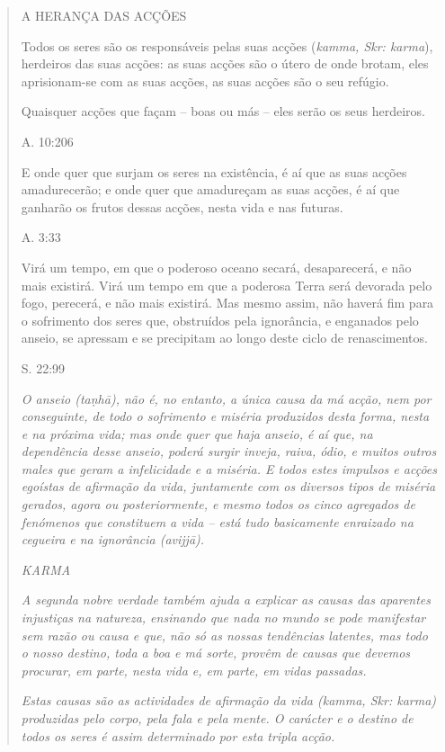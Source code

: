 \begin{quote}
A HERANÇA DAS ACÇÕES

Todos os seres são os responsáveis pelas suas acções (\emph{kamma, Skr: karma}), herdeiros das suas acções: as suas acções são o útero de onde brotam, eles aprisionam-se com as suas acções, as suas acções são o seu refúgio.

Quaisquer acções que façam -- boas ou más -- eles serão os seus herdeiros.

A. 10:206

E onde quer que surjam os seres na existência, é aí que as suas acções amadurecerão; e onde quer que amadureçam as suas acções, é aí que ganharão os frutos dessas acções, nesta vida e nas futuras.

A. 3:33

Virá um tempo, em que o poderoso oceano secará, desaparecerá, e não mais existirá. Virá um tempo em que a poderosa Terra será devorada pelo fogo, perecerá, e não mais existirá. Mas mesmo assim, não haverá fim para o sofrimento dos seres que, obstruídos pela ignorância, e enganados pelo anseio, se apressam e se precipitam ao longo deste ciclo de renascimentos.

S. 22:99

\emph{O anseio (taṇhā), não é, no entanto, a única causa da má acção, nem por conseguinte, de todo o sofrimento e miséria produzidos desta forma, nesta e na próxima vida; mas onde quer que haja anseio, é aí que, na dependência desse anseio, poderá surgir inveja, raiva, ódio, e muitos outros males que geram a infelicidade e a miséria. E todos estes impulsos e acções egoístas de afirmação da vida, juntamente com os diversos tipos de miséria gerados, agora ou posteriormente, e mesmo todos os cinco agregados de fenómenos que constituem a vida -- está tudo basicamente enraizado na cegueira e na ignorância (avijjā).}

\emph{KARMA}

\emph{A segunda nobre verdade também ajuda a explicar as causas das aparentes injustiças na natureza, ensinando que nada no mundo se pode manifestar sem razão ou causa e que, não só as nossas tendências latentes, mas todo o nosso destino, toda a boa e má sorte, provêm de causas que devemos procurar, em parte, nesta vida e, em parte, em vidas passadas.}

\emph{Estas causas são as actividades de afirmação da vida (kamma, Skr: karma) produzidas pelo corpo, pela fala e pela mente. O carácter e o destino de todos os seres é assim determinado por esta tripla acção.}


\end{quote}
